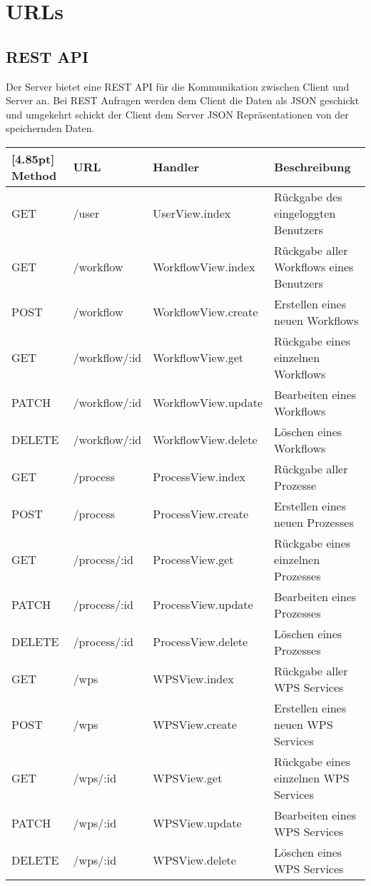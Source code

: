 \chapter{URLs}
    \section{REST API}
    Der Server bietet eine \gls{REST} API für die Kommunikation zwischen Client und Server an. 
    Bei REST Anfragen werden dem Client die Daten als JSON geschickt und umgekehrt schickt der Client dem Server JSON Repräsentationen von der speichernden Daten. 
    
    \begin{center}
	    \setlength\tabcolsep{5pt}
    	\renewcommand{\arraystretch}{1.5}
        	\begin{tabularx}{\textwidth}{|l|l|l|X|}
        	\hline
        	\rowcolor[gray]{0.75}[4.85pt]
    		Method & URL & Handler & Beschreibung \\ \hline 
            GET & /user & UserView.index & Rückgabe des eingeloggten Benutzers \\ \hline
            \hline 
            GET & /workflow & WorkflowView.index & Rückgabe aller Workflows eines Benutzers \\ \hline
            POST & /workflow & WorkflowView.create & Erstellen eines neuen Workflows  \\ \hline
            GET & /workflow/:id & WorkflowView.get & Rückgabe eines einzelnen Workflows \\ \hline
            PATCH & /workflow/:id & WorkflowView.update & Bearbeiten eines Workflows \\ \hline
            DELETE & /workflow/:id & WorkflowView.delete & Löschen eines Workflows \\ \hline
            \hline 
            GET & /process & ProcessView.index & Rückgabe aller Prozesse \\ \hline
            POST & /process & ProcessView.create & Erstellen eines neuen Prozesses \\ \hline
            GET & /process/:id & ProcessView.get & Rückgabe eines einzelnen Prozesses \\ \hline
            PATCH & /process/:id & ProcessView.update & Bearbeiten eines Prozesses \\ \hline
            DELETE & /process/:id & ProcessView.delete & Löschen eines Prozesses \\ \hline
            \hline 
            GET & /wps & WPSView.index & Rückgabe aller WPS Services \\ \hline
            POST & /wps & WPSView.create & Erstellen eines neuen WPS Services \\ \hline
            GET & /wps/:id & WPSView.get & Rückgabe eines einzelnen WPS Services \\ \hline
            PATCH & /wps/:id & WPSView.update & Bearbeiten eines WPS Services \\ \hline
            DELETE & /wps/:id & WPSView.delete & Löschen eines WPS Services \\ \hline
        	\end{tabularx}
	\end{center}

